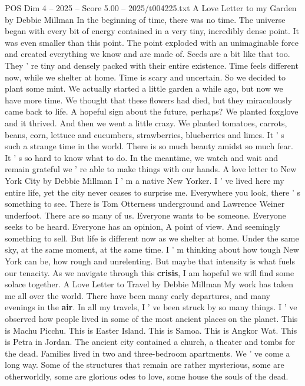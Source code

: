 \begin{textsample}{POS Dim 4 – 2025 – Score 5.00 – 2025/t004225.txt}  \label{ex:f4_pos_004}
A Love Letter to my Garden by Debbie Millman In the beginning of time, there was no time.
The universe began with every bit of energy contained in a very tiny, incredibly dense point.
It was even smaller than this point.
The point exploded with an unimaginable force and created everything we know and are made of.
Seeds are a bit like that too.
They ' re tiny and densely packed with their entire existence.
Time feels different now, while we shelter at home.
Time is scary and uncertain.
So we decided to plant some mint.
We actually started a little garden a while ago, but now we have more time.
We thought that these flowers had died, but they miraculously came back to life.
A hopeful sign about the future, perhaps?
We planted foxglove and it thrived.
And then we went a little crazy.
We planted tomatoes, carrots, beans, corn, lettuce and cucumbers, strawberries, blueberries and limes.
It ' s such a strange time in the world.
There is so much beauty amidst so much fear.
It ' s so hard to know what to do.
In the meantime, we watch and wait and remain grateful we ' re able to make things with our hands.
A love letter to New York City by Debbie Millman I ' m a native New Yorker.
I ' ve lived here my entire life, yet the city never ceases to surprise me.
Everywhere you look, there ' s something to see.
There is Tom Otterness underground and Lawrence Weiner underfoot.
There are so many of us.
Everyone wants to be someone.
Everyone seeks to be heard.
Everyone has an opinion, A point of view.
And seemingly something to sell.
But life is different now as we shelter at home.
Under the same sky, at the same moment, at the same time.
I ' m thinking about how tough New York can be, how rough and unrelenting.
But maybe that intensity is what fuels our tenacity.
As we navigate through this \textbf{crisis}, I am hopeful we will find some solace together.
A Love Letter to Travel by Debbie Millman My work has taken me all over the world.
There have been many early departures, and many evenings in the \textbf{air}.
In all my travels, I ' ve been struck by so many things.
I ' ve observed how people lived in some of the most ancient places on the planet.
This is Machu Picchu.
This is Easter Island.
This is Samoa.
This is Angkor Wat.
This is Petra in Jordan.
The ancient city contained a church, a theater and tombs for the dead.
Families lived in two and three-bedroom apartments.
We ' ve come a long way.
Some of the structures that remain are rather mysterious, some are otherworldly, some are glorious odes to love, some house the souls of the dead.

\end{textsample}
